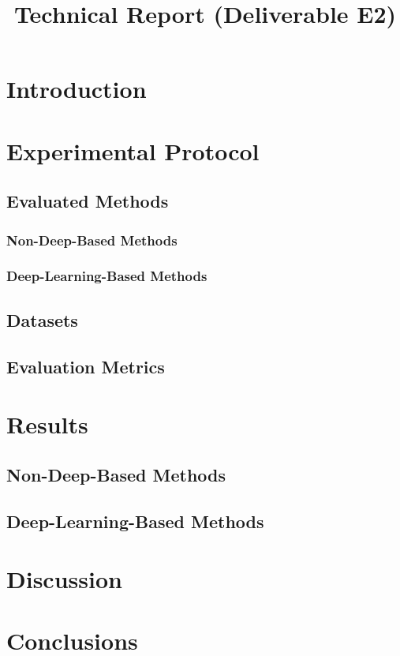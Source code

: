 \documentclass{article}
\title{Technical Report (Deliverable E2)}
\begin{document}
\maketitle

    \section{Introduction}
    \section{Experimental Protocol}
        \subsection{Evaluated Methods}
            \subsubsection{Non-Deep-Based Methods}
            \subsubsection{Deep-Learning-Based Methods}
        \subsection{Datasets}
        \subsection{Evaluation Metrics}
    \section{Results}
        \subsection{Non-Deep-Based Methods}
        \subsection{Deep-Learning-Based Methods}
    \section{Discussion}
    \section{Conclusions}
\end{document}
